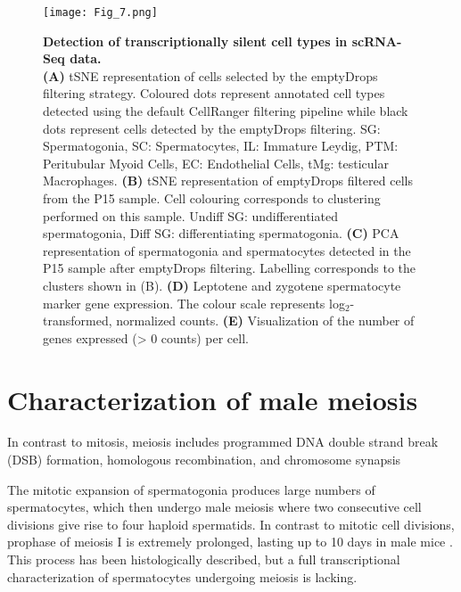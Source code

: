 \begin{figure}[!h]
\centering
\texttt{[image: Fig\_7.png]}
\caption[Transcriptionally silent cell types in spermatogenesis.]{\textbf{Detection of transcriptionally silent cell types in scRNA-Seq data.} \\
\textbf{(A)} tSNE representation of cells selected by the emptyDrops filtering strategy. Coloured dots represent annotated cell types detected using the default CellRanger filtering pipeline while black dots represent cells detected by the emptyDrops filtering. SG: Spermatogonia, SC: Spermatocytes, IL: Immature Leydig, PTM: Peritubular Myoid Cells, EC: Endothelial Cells, tMg: testicular Macrophages. \textbf{(B)} tSNE representation of emptyDrops filtered cells from the P15 sample. Cell colouring corresponds to clustering performed on this sample. Undiff SG: undifferentiated spermatogonia, Diff SG: differentiating spermatogonia. \textbf{(C)} PCA representation of spermatogonia and spermatocytes detected in the P15 sample after emptyDrops filtering. Labelling corresponds to the clusters shown in (B). \textbf{(D)} Leptotene and zygotene spermatocyte marker gene expression. The colour scale represents log$_2$-transformed, normalized counts. \textbf{(E)} Visualization of the number of genes expressed (> 0 counts) per cell.
}
\label{fig3:emptyDrops}
\end{figure}

\newpage


\section{Characterization of male meiosis}

In contrast to mitosis, meiosis includes programmed DNA double strand break (DSB) formation, homologous recombination, and chromosome synapsis \citep{Marston2004}

The mitotic expansion of spermatogonia produces large numbers of spermatocytes, which then undergo male meiosis where two consecutive cell divisions give rise to four haploid spermatids. In contrast to mitotic cell divisions, prophase of meiosis I is extremely prolonged, lasting up to 10 days in male mice \citep{Soh2017}. This process has been histologically described, but a full transcriptional characterization of spermatocytes undergoing meiosis is lacking. \\

